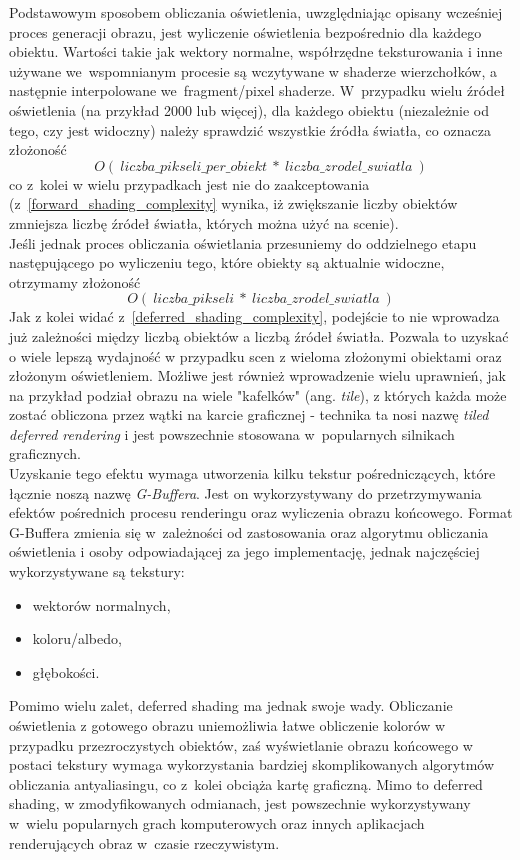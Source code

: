 Podstawowym sposobem obliczania oświetlenia, uwzględniając opisany wcześniej proces generacji obrazu, jest wyliczenie oświetlenia bezpośrednio dla każdego obiektu. Wartości takie jak wektory normalne, współrzędne teksturowania i inne używane we~wspomnianym procesie są wczytywane w shaderze wierzchołków, a następnie interpolowane we~fragment/pixel shaderze. W~przypadku wielu źródeł oświetlenia (na przykład 2000 lub więcej), dla każdego obiektu (niezależnie od tego, czy jest widoczny) należy sprawdzić wszystkie źródła światła, co oznacza złożoność
\begin{equation}
\label{forward_shading_complexity}
O(~liczba\_pikseli\_per\_obiekt~*~liczba\_zrodel\_swiatla~)
\end{equation}
co z~kolei w wielu przypadkach jest nie do zaakceptowania (z~\ref{forward_shading_complexity} wynika, iż zwiększanie liczby obiektów zmniejsza liczbę źródeł światła, których można użyć na scenie).\\
Jeśli jednak proces obliczania oświetlania przesuniemy do oddzielnego etapu następującego po wyliczeniu tego, które obiekty są aktualnie widoczne, otrzymamy złożoność
\begin{equation}
\label{deferred_shading_complexity}
O(~liczba\_pikseli~*~liczba\_zrodel\_swiatla~)
\end{equation}
Jak z kolei widać z~\ref{deferred_shading_complexity}, podejście to nie wprowadza już zależności między liczbą obiektów a liczbą źródeł światła. Pozwala to uzyskać o wiele lepszą wydajność w przypadku scen z wieloma złożonymi obiektami oraz złożonym oświetleniem. Możliwe jest również wprowadzenie wielu uprawnień, jak na przykład podział obrazu na wiele "kafelków" (ang. \emph{tile}), z których każda może zostać obliczona przez wątki na karcie graficznej - technika ta nosi nazwę \emph{tiled deferred rendering} i jest powszechnie stosowana w~popularnych silnikach graficznych.\\
Uzyskanie tego efektu wymaga utworzenia kilku tekstur pośredniczących, które łącznie noszą nazwę \emph{G-Buffera}. Jest on wykorzystywany do przetrzymywania efektów pośrednich procesu renderingu oraz wyliczenia obrazu końcowego. Format G-Buffera zmienia się w~zależności od zastosowania oraz algorytmu obliczania oświetlenia i osoby odpowiadającej za jego implementację, jednak najczęściej wykorzystywane są tekstury:
\begin{itemize}
\item wektorów normalnych,
\item koloru/albedo,
\item głębokości.
\end{itemize}
Pomimo wielu zalet, deferred shading ma jednak swoje wady. Obliczanie oświetlenia z gotowego obrazu uniemożliwia łatwe obliczenie kolorów w przypadku przezroczystych obiektów, zaś wyświetlanie obrazu końcowego w postaci tekstury wymaga wykorzystania bardziej skomplikowanych algorytmów obliczania antyaliasingu, co z~kolei obciąża kartę graficzną. Mimo to deferred shading, w zmodyfikowanych odmianach, jest powszechnie wykorzystywany w~wielu popularnych grach komputerowych oraz innych aplikacjach renderujących obraz w~czasie rzeczywistym.

